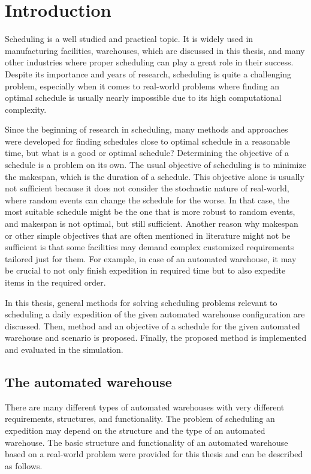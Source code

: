 \documentclass{ctuthesis}
\begin{document}
\maketitle

\chapter{Introduction}

Scheduling is a well studied and practical topic. It is widely used in manufacturing facilities, warehouses, which are discussed in this thesis, and many other industries where proper scheduling can play a great role in their success. Despite its importance and years of research, scheduling is quite a challenging problem, especially when it comes to real-world problems where finding an optimal schedule is usually nearly impossible due to its high computational complexity. 

Since the beginning of research in scheduling, many methods and approaches were developed for finding schedules close to optimal schedule in a reasonable time, but what is a good or optimal schedule? Determining the objective of a schedule is a problem on its own. The usual objective of scheduling is to minimize the makespan, which is the duration of a schedule. This objective alone is usually not sufficient because it does not consider the stochastic nature of real-world, where random events can change the schedule for the worse. In that case, the most suitable schedule might be the one that is more robust to random events, and makespan is not optimal, but still sufficient. Another reason why makespan or other simple objectives that are often mentioned in literature might not be sufficient is that some facilities may demand complex customized requirements tailored just for them. For example, in case of an automated warehouse, it may be crucial to not only finish expedition in required time but to also expedite items in the required order. 

In this thesis, general methods for solving scheduling problems relevant to scheduling a daily expedition of the given automated warehouse configuration are discussed. Then, method and an objective of a schedule for the given automated warehouse and scenario is proposed. Finally, the proposed method is implemented and evaluated in the simulation.

\section{The automated warehouse}
\label{sec:wh}
There are many different types of automated warehouses with very different requirements, structures, and functionality. The problem of scheduling an expedition may depend on the structure and the type of an automated warehouse. The basic structure and functionality of an automated warehouse based on a real-world problem were provided for this thesis and can be described as follows.
\end{document}
